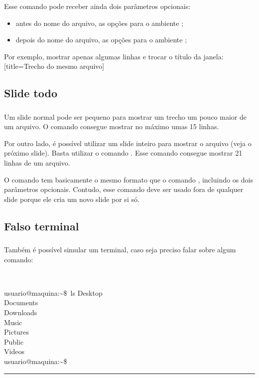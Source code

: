 \documentclass[aspectratio=169]{beamer}
\begin{document}
\begin{frame}[t]\frametitle{\secname}\framesubtitle{\subsecname}
  Esse comando pode receber ainda dois parâmetros opcionais:
  \begin{itemize}
    \item antes do nome do arquivo, as opções para o ambiente ;
    \item depois do nome do arquivo, as opções para o ambiente ;
  \end{itemize}

  Por exemplo, mostrar apenas algumas linhas e trocar o título da janela:
[title={Trecho do mesmo arquivo}]
\end{frame}

\subsection{Slide todo}

\begin{frame}[t]\frametitle{\secname}\framesubtitle{\subsecname}
  Um slide normal pode ser pequeno para mostrar um trecho um pouco maior de um arquivo.
  O comando  consegue mostrar no máximo umas 15 linhas.

  Por outro lado, é possível utilizar um slide inteiro para mostrar o arquivo (veja o próximo slide).
  Basta utilizar o comando .
  Esse comando consegue mostrar 21 linhas de um arquivo.

  O comando  tem basicamente o mesmo formato que o comando , incluindo os dois parâmetros opcionais.
  Contudo, esse comando deve ser usado fora de qualquer slide porque ele cria um novo slide por si só.
\end{frame}


\subsection{Falso terminal}

\begin{frame}[t]\frametitle{\secname}\framesubtitle{\subsecname}
  Também é possível simular um terminal, caso seja preciso falar sobre algum comando:

  ~
  \def\prompt{\color{codekeyword}usuario@maquina:{\textasciitilde}\$\color{codefg}~}
  \begin{terminal}[title={Bash}]
  \prompt ls
  Desktop\\Documents\\Downloads\\Music\\Pictures\\Public\\Videos\\
  \prompt \rule{1ex}{1em}
  \end{terminal}
\end{frame}
\end{document}
